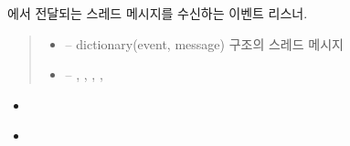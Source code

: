 \documentclass[a4paper,10pt,english]{sphinxmanual}
\begin{document}
\begin{fulllineitems}
\begin{fulllineitems}
\begin{quote}
\begin{description}
\end{description}\end{quote}

\end{fulllineitems}


\begin{fulllineitems}
\label{\detokenize{_SessionRequester:SessionRequester._smListener}}
\pysigstartsignatures
{}
\pysigstopsignatures
\sphinxAtStartPar
{\hyperref[\detokenize{_SessionManager:sessionmanager}]{}} 에서 전달되는 스레드 메시지를 수신하는 이벤트 리스너.
\begin{quote}\begin{description}
\begin{itemize}
\item {} 
\sphinxAtStartPar
{} – dictionary(event, message) 구조의 스레드 메시지

\item {} 
\sphinxAtStartPar
{} – , , , , 

\end{itemize}

\end{description}\end{quote}


\nopagebreak

\begin{itemize}
\item {} 
\sphinxAtStartPar
{\hyperref[\detokenize{_SessionManager:SessionManager._srInit}]{}}

\item {} 
\sphinxAtStartPar
{\hyperref[\detokenize{_SessionManager:SessionManager._srStartSessionConnection}]{}}


\end{itemize}
\end{fulllineitems}
\end{fulllineitems}
\end{document}
